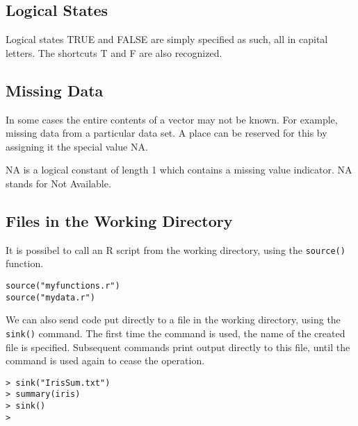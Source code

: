 \documentclass[a4paper,12pt]{article}
\begin{document}
\subsection{Logical States}

Logical states TRUE and FALSE are simply specified as such, all in capital letters. The shortcuts T and F are also recognized.


\subsection{Missing Data}
In some cases the entire contents of a vector may not be known.
For example, missing data from a particular data set.
A place can be reserved for this by assigning it the special value NA.

NA is a logical constant of length 1 which contains a missing value indicator.
NA stands for Not Available.



\subsection{Files in the Working Directory}
It is possibel to call an R script from the working directory, using the \texttt{source()} function.

\begin{framed}
\begin{verbatim}
source("myfunctions.r")
source("mydata.r")
\end{verbatim}
\end{framed}

We can also send code put directly to a file in the working directory, using the \texttt{sink()} command.
The first time the command is used, the name of the created file is specified. Subsequent commands print output directly to this file, until the command is used again to cease the operation.
\begin{framed}
\begin{verbatim}
> sink("IrisSum.txt")
> summary(iris)
> sink()
> 
\end{verbatim}
\end{framed}
\end{document}
